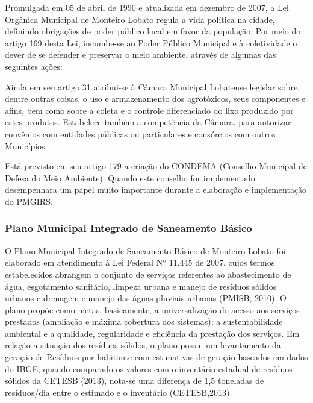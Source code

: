 	Promulgada em 05 de abril de 1990 e atualizada em dezembro de 2007, a Lei Orgânica Municipal de Monteiro Lobato regula a vida política na cidade, definindo obrigações de poder público local em favor da população. Por meio do artigo 169 desta Lei, incumbe-se ao Poder Público Municipal e à coletividade o dever de se defender e preservar o meio ambiente, através de algumas das seguintes ações:
	
	
	Ainda em seu artigo 31 atribui-se à Câmara Municipal Lobatense legislar sobre, dentre outras coisas, o uso e armazenamento dos agrotóxicos, seus componentes e afins, bem como sobre a coleta e o controle diferenciado do lixo produzido por estes produtos. Estabelece também a competência da Câmara, para autorizar convênios com entidades públicas ou particulares e consórcios com outros Municípios.
	
	Está previsto em seu artigo 179 a criação do CONDEMA (Conselho Municipal de Defesa do Meio Ambiente). Quando este conselho for implementado desempenhara um papel muito importante durante a elaboração e implementação do PMGIRS.
	
	\subsubsection{Plano Municipal Integrado de Saneamento Básico}
	
	O Plano Municipal Integrado de Saneamento Básico de Monteiro Lobato foi elaborado em atendimento à Lei Federal Nº 11.445 de 2007, cujos termos estabelecidos abrangem o conjunto de serviços referentes ao abastecimento de água, esgotamento sanitário, limpeza urbana e manejo de resíduos sólidos urbanos e drenagem e manejo das águas pluviais urbanas (PMISB, 2010). O plano propõe como metas, basicamente, a universalização do acesso aos serviços prestados (ampliação e máxima cobertura dos sistemas); a sustentabilidade ambiental e a qualidade, regularidade e eficiência da prestação dos serviços. Em relação a situação dos resíduos sólidos, o plano possui um levantamento da geração de Resíduos por habitante com estimativas de geração baseados em dados do IBGE, quando comparado os valores com o inventário estadual de resíduos sólidos da CETESB (2013), nota-se uma diferença de 1,5 toneladas de resíduos/dia entre o estimado e o inventário (CETESB,2013).
	
